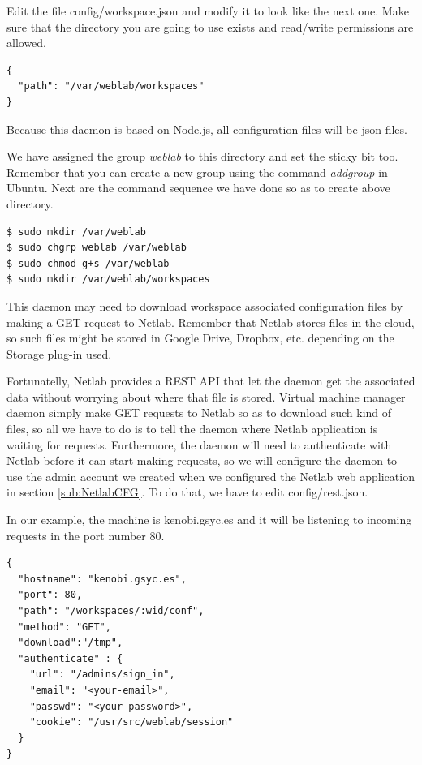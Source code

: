 \documentclass{article}
\begin{document}
Edit the file config/workspace.json and modify it to look like the next one. Make sure that the directory you are going to use exists and read/write permissions are allowed.

\begin{verbatim}
{
  "path": "/var/weblab/workspaces"
}
\end{verbatim}

Because this daemon is based on Node.js, all configuration files will be json files.

We have assigned the group \textit{weblab} to this directory and set the sticky bit too. Remember that you can create a new group using the command \textit{addgroup} in Ubuntu. Next are the command sequence we have done so as to create above directory.

\begin{verbatim}
$ sudo mkdir /var/weblab
$ sudo chgrp weblab /var/weblab
$ sudo chmod g+s /var/weblab
$ sudo mkdir /var/weblab/workspaces
\end{verbatim}

This daemon may need to download workspace associated configuration files by making a GET request to Netlab. Remember that Netlab stores files in the cloud, so such files might be stored in Google Drive, Dropbox, etc. depending on the Storage plug-in used.

Fortunatelly, Netlab provides a REST API that let the daemon get the associated data without worrying about where that file is stored. Virtual machine manager daemon simply make GET requests to Netlab so as to download such kind of files, so all we have to do is to tell the daemon where Netlab application is waiting for requests. Furthermore, the daemon will need to authenticate with Netlab before it can start making requests, so we will configure the daemon to use the admin account we created when we configured the Netlab web application in section \ref{sub:NetlabCFG}. To do that, we have to edit config/rest.json.

In our example, the machine is kenobi.gsyc.es and it will be listening to incoming requests in the port number 80.

\begin{verbatim}
{
  "hostname": "kenobi.gsyc.es",
  "port": 80,
  "path": "/workspaces/:wid/conf",
  "method": "GET",
  "download":"/tmp",
  "authenticate" : {
    "url": "/admins/sign_in",
    "email": "<your-email>",
    "passwd": "<your-password>",
    "cookie": "/usr/src/weblab/session"
  }
}
\end{verbatim}
\end{document}

